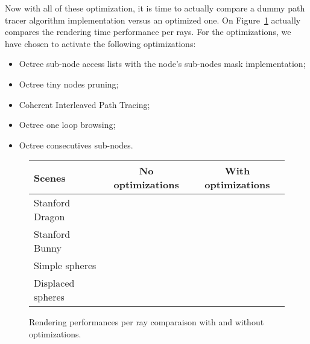 Now with all of these optimization, it is time to actually compare a dummy
path tracer algorithm implementation versus an optimized one. On Figure~\ref{table:final_perfs}
actually compares the rendering time performance per rays. For the optimizations,
we have chosen to activate the following optimizations:

\begin{itemize}
    \item Octree sub-node access lists with the node's sub-nodes mask implementation;
    \item Octree tiny nodes pruning;
    \item Coherent Interleaved Path Tracing;
    \item Octree one loop browsing;
    \item Octree consecutives sub-nodes.
\end{itemize}

\begin{figure}[H]
    \tiny
    \centering
    \begin{tabular}{ | l | c | c | }
        \hline
        Scenes & No optimizations & With optimizations \\
        \hline
        Stanford Dragon & ~ & ~ \\
        Stanford Bunny & ~ & ~ \\
        Simple spheres & ~ & ~ \\
        Displaced spheres & ~ & ~ \\
        \hline
    \end{tabular}
    \caption{
        Rendering performances per ray comparaison with and without
        optimizations.
    }
    \label{table:final_perfs}
\end{figure}
